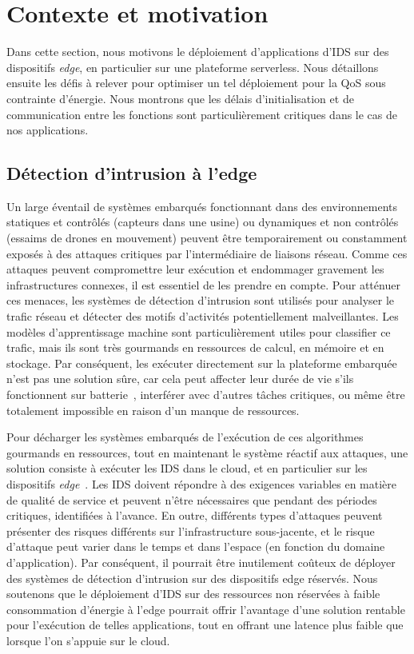 \section{Contexte et motivation}
\label{section:herocache-background}

Dans cette section, nous motivons le déploiement d'applications d'\gls{IDS} sur des dispositifs \textit{edge}, en particulier sur une plateforme serverless. Nous détaillons ensuite les défis à relever pour optimiser un tel déploiement pour la \gls{QoS} sous contrainte d'énergie. Nous montrons que les délais d'initialisation et de communication entre les fonctions sont particulièrement critiques dans le cas de nos applications.

\subsection{Détection d'intrusion à l'edge}

Un large éventail de systèmes embarqués fonctionnant dans des environnements statiques et contrôlés (capteurs dans une usine) ou dynamiques et non contrôlés (essaims de drones en mouvement) peuvent être temporairement ou constamment exposés à des attaques critiques par l'intermédiaire de liaisons réseau. Comme ces attaques peuvent compromettre leur exécution et endommager gravement les infrastructures connexes, il est essentiel de les prendre en compte. Pour atténuer ces menaces, les systèmes de détection d'intrusion sont utilisés pour analyser le trafic réseau et détecter des motifs d'activités potentiellement malveillantes. Les modèles d'apprentissage machine sont particulièrement utiles pour classifier ce trafic, mais ils sont très gourmands en ressources de calcul, en mémoire et en stockage. Par conséquent, les exécuter directement sur la plateforme embarquée n'est pas une solution sûre, car cela peut affecter leur durée de vie s'ils fonctionnent sur batterie~\cite{slimani:hal-04159551}, interférer avec d'autres tâches critiques, ou même être totalement impossible en raison d'un manque de ressources.

Pour décharger les systèmes embarqués de l'exécution de ces algorithmes gourmands en ressources, tout en maintenant le système réactif aux attaques, une solution consiste à exécuter les \gls{IDS} dans le cloud, et en particulier sur les dispositifs \textit{edge}~\cite{eskandari2020}. Les IDS doivent répondre à des exigences variables en matière de qualité de service et peuvent n'être nécessaires que pendant des périodes critiques, identifiées à l'avance. En outre, différents types d'attaques peuvent présenter des risques différents sur l'infrastructure sous-jacente, et le risque d'attaque peut varier dans le temps et dans l'espace (en fonction du domaine d'application). Par conséquent, il pourrait être inutilement coûteux de déployer des systèmes de détection d'intrusion sur des dispositifs edge réservés. Nous soutenons que le déploiement d'IDS sur des ressources non réservées à faible consommation d'énergie à l'edge pourrait offrir l'avantage d'une solution rentable pour l'exécution de telles applications, tout en offrant une latence plus faible que lorsque l'on s'appuie sur le cloud.

